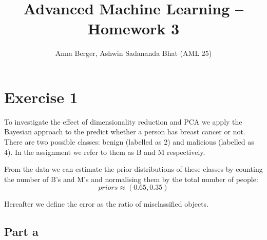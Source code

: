 \documentclass[11pt,a4paper]{article}
\title{\textbf{Advanced Machine Learning -- Homework 3}}
\author{Anna Berger, Ashwin Sadananda Bhat (AML 25)}
\begin{document}
\maketitle
  
 \section*{Exercise 1}
 To investigate the effect of dimensionality reduction and PCA we apply the Bayesian approach to the predict whether a person has breast cancer or not. There are two possible classes: benign (labelled as 2) and malicious (labelled as 4). In the assignment we refer to them as B and M respectively.
 
  From the data we can estimate the prior distributions of these classes by counting the number of B's and M's and normalising them by the total number of people: $$ priors \approx (0.65, 0.35) $$ 
 
 Hereafter we define the error as the ratio of misclassified objects.
 
 
 \subsection*{Part a}
 
\end{document}
